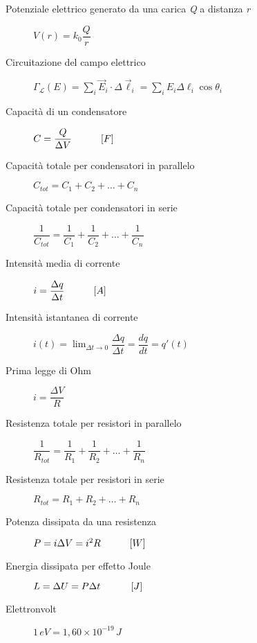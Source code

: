 \documentclass[a4paper,11pt,italian]{article}
\begin{document}
\begin{description}
  \item[Potenziale elettrico generato da una carica \textit{Q} a distanza \textit{r}]
  $ V(r) = k_0 \dfrac{Q}{r}  $
  
  \item[Circuitazione del campo elettrico]\label{conc:circuitazioneE}
  $ \Gamma_\mathscr{L}(E) = \sum_i  \vec{E}_i \cdot \Delta\vec{\ell}_i = \sum_i E_i \Delta \ell_i \cos \theta_i $
  
  \item[Capacità di un condensatore]
  $ C = \dfrac{Q}{\Delta V} \hspace*{3em} [F] $
  
  \item[Capacità totale per condensatori in parallelo] 
  $ C_{tot} = C_1 + C_2 + \ldots + C_n $ 
  
  \item[Capacità totale per condensatori in serie] 
  $ \dfrac{1}{C_{tot}} = \dfrac{1}{C_1} + \dfrac{1}{C_2} + \ldots + \dfrac{1}{C_n}  $

  \item[Intensità media di corrente]
  $ i = \dfrac{\Delta q}{\Delta t} \hspace*{3em} [A]  $
  
  \item[Intensità istantanea di corrente]
  $ i(t) = \displaystyle \lim_{\Delta t \rightarrow 0} \dfrac{\Delta q}{\Delta t} = \dfrac{dq}{dt} = q'(t) $
  
  \item[Prima legge di Ohm]
  $ i = \dfrac{\Delta V}{R} $
  
  \item[Resistenza totale per resistori in parallelo] 
  $ \dfrac{1}{R_{tot}} = \dfrac{1}{R_1} + \dfrac{1}{R_2} + \ldots + \dfrac{1}{R_n}  $

  \item[Resistenza totale per resistori in serie] 
  $ R_{tot} = R_1 + R_2 + \ldots + R_n $

  \item[Potenza dissipata da una resistenza]
  $ P = i \Delta V = i^2 R \hspace*{3em} [W] $
  
  \item[Energia dissipata per effetto Joule] 
  $ L = \Delta U = P \Delta t \hspace*{3em} \left[ J \right] $
  
    
  \item[Elettronvolt] 
  $ 1 \, eV = 1,60 \times 10^{-19} \, J $
  

\end{description}
\end{document}
